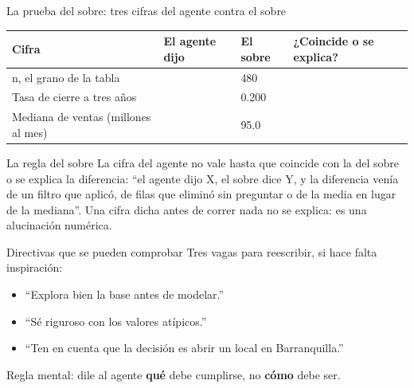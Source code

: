 \documentclass{beamer}
\begin{document}
\begin{frame}{La prueba del sobre: tres cifras del agente contra el sobre}
\small
\begin{tabular}{@{}p{} p{} p{} p{}@{}}
\toprule
Cifra & El agente dijo & El sobre & ¿Coincide o se explica? \\
\midrule
n, el grano de la tabla & \rule{0pt}{14pt} & 480 & \\
Tasa de cierre a tres años & \rule{0pt}{14pt} & 0.200 & \\
Mediana de ventas (millones al mes) & \rule{0pt}{14pt} & 95.0 & \\
\bottomrule
\end{tabular}
\medskip

\begin{block}{La regla del sobre}
La cifra del agente no vale hasta que coincide con la del sobre o se explica la diferencia: ``el agente dijo X, el sobre dice Y, y la diferencia venía de un filtro que aplicó, de filas que eliminó sin preguntar o de la media en lugar de la mediana''. Una cifra dicha antes de correr nada no se explica: es una alucinación numérica.
\end{block}
\end{frame}

\begin{frame}{Directivas que se pueden comprobar}
\medskip
\small Tres vagas para reescribir, si hace falta inspiración:
\begin{itemize}\itemsep3pt
  \item ``Explora bien la base antes de modelar.''
  \item ``Sé riguroso con los valores atípicos.''
  \item ``Ten en cuenta que la decisión es abrir un local en Barranquilla.''
\end{itemize}
\medskip
Regla mental: dile al agente \textbf{qué} debe cumplirse, no \textbf{cómo} debe ser.
\end{frame}
\end{document}
